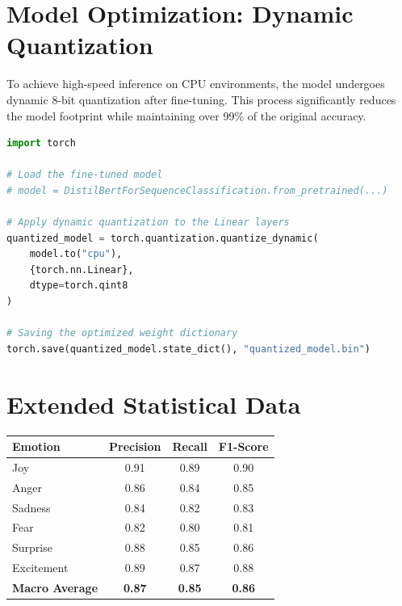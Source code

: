 \documentclass[]{interact}
\theoremstyle{plain}
\theoremstyle{definition}
\theoremstyle{remark}
\begin{document}
\section{Model Optimization: Dynamic Quantization}
To achieve high-speed inference on CPU environments, the model undergoes dynamic 8-bit quantization after fine-tuning. This process significantly reduces the model footprint while maintaining over 99\% of the original accuracy.

\begin{lstlisting}[language=Python, caption=Post-Training Dynamic Quantization]
import torch

# Load the fine-tuned model
# model = DistilBertForSequenceClassification.from_pretrained(...)

# Apply dynamic quantization to the Linear layers
quantized_model = torch.quantization.quantize_dynamic(
    model.to("cpu"), 
    {torch.nn.Linear}, 
    dtype=torch.qint8
)

# Saving the optimized weight dictionary
torch.save(quantized_model.state_dict(), "quantized_model.bin")
\end{lstlisting}

\section{Extended Statistical Data}

\begin{table}[H]
{\begin{tabular}{|l|c|c|c|}
\hline
\textbf{Emotion} & \textbf{Precision} & \textbf{Recall} & \textbf{F1-Score} \\
\hline
Joy & 0.91 & 0.89 & 0.90 \\
Anger & 0.86 & 0.84 & 0.85 \\
Sadness & 0.84 & 0.82 & 0.83 \\
Fear & 0.82 & 0.80 & 0.81 \\
Surprise & 0.88 & 0.85 & 0.86 \\
Excitement & 0.89 & 0.87 & 0.88 \\
\hline
\textbf{Macro Average} & \textbf{0.87} & \textbf{0.85} & \textbf{0.86} \\
\hline
\end{tabular}}
\label{tab:emotion_metrics}
\end{table}
\end{document}
